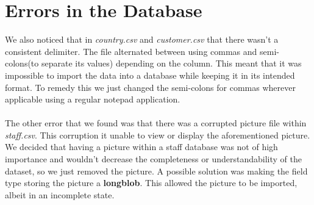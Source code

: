 \documentclass{article}
\begin{document}
\section{Errors in the Database}
	We also noticed that in \emph{country.csv} and \emph{customer.csv} that there wasn’t a consistent delimiter. The file alternated between using commas 
	and semi-colons(to separate its values) depending 
	on the column. This meant that it was impossible to import the data into a database while keeping it in its intended format. 
	To remedy this we just changed the semi-colons for commas wherever applicable using a regular notepad application.
	\\\\
	The other error that we found was that there was a corrupted picture file within \emph{staff.csv}. This corruption it unable to view or display the aforementioned picture. 
	We decided that having a picture within a staff database was not of high importance and wouldn’t decrease the completeness or understandability of the dataset,
	so we just removed the picture. A possible solution was making the field type storing the picture a \textbf{longblob}. 
	This allowed the picture to be imported, albeit in an incomplete state.
\end{document}

